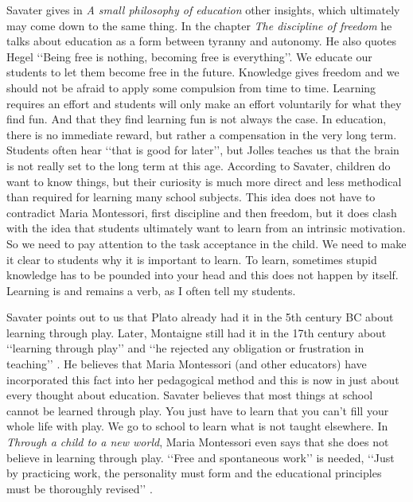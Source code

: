 \documentclass[12pt, a4paper]{article}
\begin{document}
Savater \cite[]{savater} gives in \emph{A small philosophy of education} other insights, which ultimately may come down to the same thing. In the chapter \emph{The discipline of freedom} he talks about education as a form between tyranny and autonomy. He also quotes Hegel ‘‘Being free is nothing, becoming free is everything’’. We educate our students to let them become free in the future. Knowledge gives freedom and we should not be afraid to apply some compulsion from time to time. Learning requires an effort and students will only make an effort voluntarily for what they find fun. And that they find learning fun is not always the case. In education, there is no immediate reward, but rather a compensation in the very long term. Students often hear ‘‘that is good for later’’, but Jolles \cite{jolles} teaches us that the brain is not really set to the long term at this age. According to Savater, children do want to know things, but their curiosity is much more direct and less methodical than required for learning many school subjects. \cite[pp. 84-89]{savater} This idea does not have to contradict Maria Montessori, first discipline and then freedom, but it does clash with the idea that students ultimately want to learn from an intrinsic motivation. So we need to pay attention to the task acceptance in the child. We need to make it clear to students why it is important to learn. To learn, sometimes stupid knowledge has to be pounded into your head and this does not happen by itself. Learning is and remains a verb, as I often tell my students.

Savater points out to us that Plato already had it in the 5th century BC about learning through play. Later, Montaigne still had it in the 17th century about ‘‘learning through play’’ and ‘‘he rejected any obligation or frustration in teaching’’ \cite[p.97]{savater}. He believes that Maria Montessori (and other educators) have incorporated this fact into her pedagogical method and this is now in just about every thought about education. Savater believes that most things at school cannot be learned through play. You just have to learn that you can’t fill your whole life with play. We go to school to learn what is not taught elsewhere. \cite[p.87-100]{savater} In \emph{Through a child to a new world}, Maria Montessori even says that she does not believe in learning through play. ‘‘Free and spontaneous work’’ is needed, ‘‘Just by practicing work, the personality must form and the educational principles must be thoroughly revised’’ \cite[p.64]{Montessori1952}.
\end{document}
